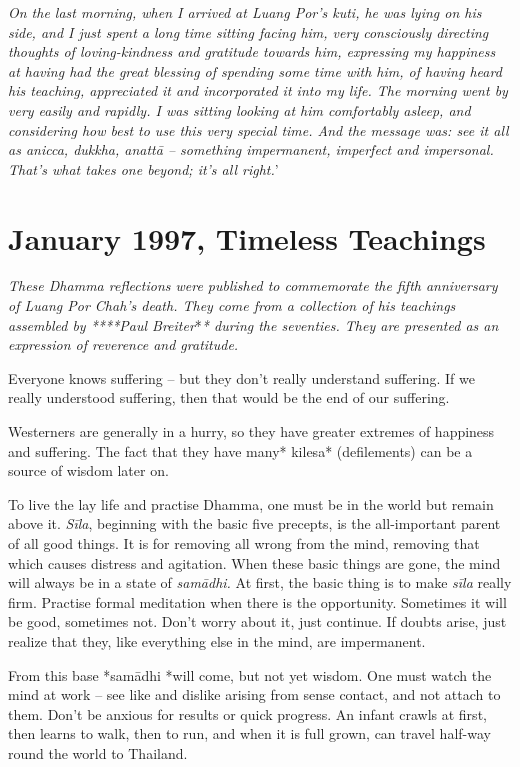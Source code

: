 \emph{On the last morning, when I arrived at Luang Por's kuti, he was
lying on his side, and I just spent a long time sitting facing him, very
consciously directing thoughts of loving-kindness and gratitude towards
him, expressing my happiness at having had the great blessing of
spending some time with him, of having heard his teaching, appreciated
it and incorporated it into my life. The morning went by very easily and
rapidly. I was sitting looking at him comfortably asleep, and
considering how best to use this very special time. And the message was: 
see it all as anicca, dukkha, anattā -- something impermanent, imperfect
and impersonal. That's what takes one beyond; it's all right.}'

\chapter{January 1997, Timeless Teachings}

\emph{These Dhamma reflections were published to commemorate the fifth
anniversary of Luang Por Chah's death. They come from a collection of
his teachings assembled by ****Paul Breiter}*\emph{* during the
seventies. They are presented as an expression of reverence and
gratitude.}

Everyone knows suffering -- but they don't really understand suffering. 
If we really understood suffering, then that would be the end of our
suffering. 

Westerners are generally in a hurry, so they have greater extremes of
happiness and suffering. The fact that they have many* kilesa*
 (defilements) can be a source of wisdom later on. 

To live the lay life and practise Dhamma, one must be in the world but
remain above it. \emph{Sīla}, beginning with the basic five precepts, is
the all-important parent of all good things. It is for removing all
wrong from the mind, removing that which causes distress and agitation. 
When these basic things are gone, the mind will always be in a state of
\emph{samādhi.} At first, the basic thing is to make \emph{sīla} really
firm. Practise formal meditation when there is the opportunity. 
Sometimes it will be good, sometimes not. Don't worry about it, just
continue. If doubts arise, just realize that they, like everything else
in the mind, are impermanent. 

From this base *samādhi *will come, but not yet wisdom. One must watch
the mind at work -- see like and dislike arising from sense contact, and
not attach to them. Don't be anxious for results or quick progress. An
infant crawls at first, then learns to walk, then to run, and when it is
full grown, can travel half-way round the world to Thailand. 

